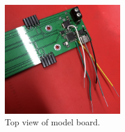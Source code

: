 \begin{figure}[h!]
    \centering
    \includegraphics[width=0.45\textwidth]{ModelBoardTop.jpg}
    \caption{Top view of model board.}
    \label{fig:ModelBoardTop}
\end{figure}
\FloatBarrier